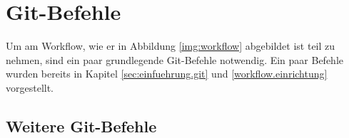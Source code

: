 \label{git-commands}
\section{Git-Befehle}
Um am Workflow, wie er in Abbildung \ref{img:workflow} abgebildet ist teil zu nehmen, sind ein paar grundlegende Git-Befehle notwendig. Ein paar Befehle wurden bereits in Kapitel \ref{sec:einfuehrung.git} und \ref{workflow.einrichtung} vorgestellt.

\label{git-commands.advanced}
\subsection{Weitere Git-Befehle}

\label{git-commands.advanced.add}

\label{git-commands.advanced.commit}

\label{git-commands.advanced.fetch}

\label{git-commands.advanced.push}

\label{git-commands.advanced.merge}

\label{git-commands.advanced.rebase}

\label{git-commands.advanced.reset}

\label{git-commands.advanced.revert}

\label{git-commands.advanced.log}

\label{git-commands.advanced.status}

\label{git-commands.advanced.diff}
